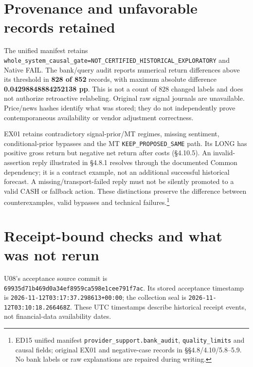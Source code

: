 \section{Provenance and unfavorable records retained}\label{s:05729fb3b09c4255}

The unified manifest retains
\texttt{whole\_\allowbreak{}system\_\allowbreak{}causal\_\allowbreak{}gate=NOT\_\allowbreak{}CERTIFIED\_\allowbreak{}HISTORICAL\_\allowbreak{}EXPLORATORY} and
Native FAIL. The bank/query audit reports numerical return differences
above its threshold in \textbf{828 of 852} records, with maximum absolute
difference \textbf{0.04298848884252138 pp}. This is not a count of 828 changed
labels and does not authorize retroactive relabeling. Original raw signal
journals are unavailable. Price/news hashes identify what was stored;
they do not independently prove contemporaneous availability or vendor
adjustment correctness.

EX01 retains contradictory signal-prior/MT regimes, missing sentiment,
conditional-prior bypasses and the MT \texttt{KEEP\_\allowbreak{}PROPOSED\_\allowbreak{}SAME} path. Its LONG
has positive gross return but negative net return after costs (§4.10.5).
An invalid-assertion reply illustrated in §4.8.1 resolves through the
documented Common dependency; it is a contract example, not an additional
successful historical forecast. A missing/transport-failed reply must not
be silently promoted to a valid CASH or fallback action. These distinctions
preserve the difference between counterexamples, valid bypasses and
technical failures.\footnote{ED15 unified manifest \texttt{provider\_\allowbreak{}support.\allowbreak{}bank\_\allowbreak{}audit}, \texttt{quality\_\allowbreak{}limits} and causal fields; original EX01 and negative-case records in §§4.8/4.10/5.8--5.9. No bank labels or raw explanations are repaired during writing.}

\section{Receipt-bound checks and what was not rerun}\label{s:1bd514c7a8d56d95}

U08's acceptance source commit is
\texttt{69935d71\allowbreak{}b469d0a3\allowbreak{}4ef8959c\allowbreak{}a598e1ce\allowbreak{}e791f7ac}. Its stored acceptance timestamp
is \texttt{2026-\allowbreak{}11-\allowbreak{}12T03:\allowbreak{}17:\allowbreak{}37.\allowbreak{}298613+00:\allowbreak{}00}; the collection seal is
\texttt{2026-\allowbreak{}11-\allowbreak{}12T03:\allowbreak{}10:\allowbreak{}18.\allowbreak{}266468Z}. These UTC timestamps describe historical
receipt events, not financial-data availability dates.

